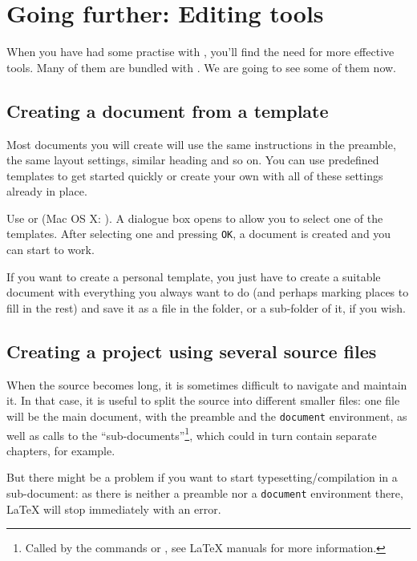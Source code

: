 
\chapter{Going further: Editing tools}

When you have had some practise with {\Tw}, you'll find the need for more effective tools. Many of them are bundled with {\Tw}. We are going to see some of them now.

\section{Creating a document from a template}

Most documents you will create will use the same instructions in the preamble, the same layout settings, similar heading and so on. You can use predefined templates to get started quickly or create your own with all of these settings already in place.

Use \submenu{} or  (Mac OS X: ). A dialogue box opens to allow you to select one of the templates. After selecting one and pressing \verb|OK|, a document is created and you can start to work.

If you want to create a personal template, you just have to create a suitable document with everything you always want to do (and perhaps marking places to fill in the rest) and save it as a  file in the  folder, or a sub-folder of it, if you wish.

\section{Creating a project using several source files}

When the source becomes long, it is sometimes difficult to navigate and maintain it. In that case, it is useful to split the source into different smaller files: one file will be the main document, with the preamble and the \verb|document| environment, as well as calls to the ``sub-documents''\footnote{Called by the commands
\verb|| or \verb||, see {\LaTeX} manuals for more information.}, which could in turn contain separate chapters, for example.

But there might be a problem if you want to start typesetting/compilation in a sub-document: as there is neither a preamble nor a \verb|document| environment there, {\LaTeX} will stop immediately with an error.

